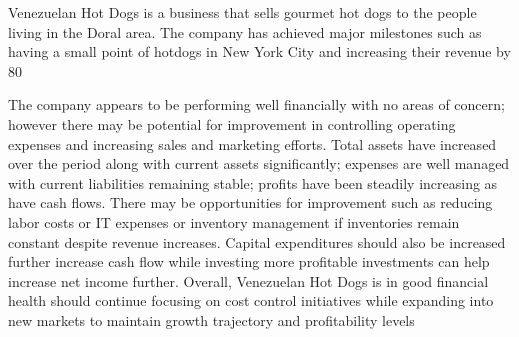  

Venezuelan Hot Dogs is a business that sells gourmet hot dogs to the people living in the Doral area. The company has achieved major milestones such as having a small point of hotdogs in New York City and increasing their revenue by 80%

The company appears to be performing well financially with no areas of concern; however there may be potential for improvement in controlling operating expenses and increasing sales and marketing efforts. Total assets have increased over the period along with current assets significantly; expenses are well managed with current liabilities remaining stable; profits have been steadily increasing as have cash flows. There may be opportunities for improvement such as reducing labor costs or IT expenses or inventory management if inventories remain constant despite revenue increases. Capital expenditures should also be increased further increase cash flow while investing more profitable investments can help increase net income further. Overall, Venezuelan Hot Dogs is in good financial health should continue focusing on cost control initiatives while expanding into new markets to maintain growth trajectory and profitability levels